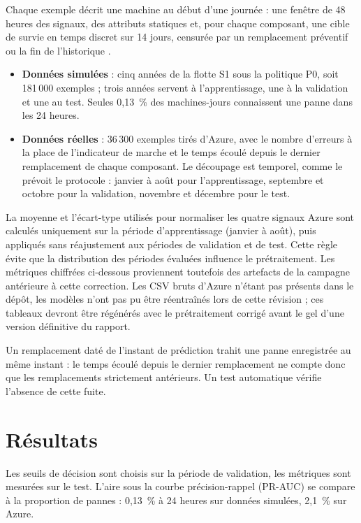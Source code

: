 \documentclass[11pt,a4paper,oneside]{report}
\begin{document}
Chaque exemple décrit une machine au début d'une journée : une fenêtre de 48 heures des signaux, des attributs statiques et, pour chaque composant, une cible de survie en temps discret sur 14 jours, censurée par un remplacement préventif ou la fin de l'historique \cite{gensheimer}.

\begin{itemize}
\item \textbf{Données simulées} : cinq années de la flotte S1 sous la politique P0, soit 181\,000 exemples ; trois années servent à l'apprentissage, une à la validation et une au test. Seules 0,13~\% des machines-jours connaissent une panne dans les 24 heures.
\item \textbf{Données réelles} : 36\,300 exemples tirés d'Azure, avec le nombre d'erreurs à la place de l'indicateur de marche et le temps écoulé depuis le dernier remplacement de chaque composant. Le découpage est temporel, comme le prévoit le protocole : janvier à août pour l'apprentissage, septembre et octobre pour la validation, novembre et décembre pour le test.
\end{itemize}

La moyenne et l'écart-type utilisés pour normaliser les quatre signaux Azure sont calculés
uniquement sur la période d'apprentissage (janvier à août), puis appliqués sans réajustement aux
périodes de validation et de test. Cette règle évite que la distribution des périodes évaluées
influence le prétraitement. Les métriques chiffrées ci-dessous proviennent toutefois des artefacts
de la campagne antérieure à cette correction. Les CSV bruts d'Azure n'étant pas présents dans le
dépôt, les modèles n'ont pas pu être réentraînés lors de cette révision ; ces tableaux devront être
régénérés avec le prétraitement corrigé avant le gel d'une version définitive du rapport.

Un remplacement daté de l'instant de prédiction trahit une panne enregistrée au même instant : le temps écoulé depuis le dernier remplacement ne compte donc que les remplacements strictement antérieurs. Un test automatique vérifie l'absence de cette fuite.

\section{Résultats}

Les seuils de décision sont choisis sur la période de validation, les métriques sont mesurées sur le test. L'aire sous la courbe précision-rappel (PR-AUC) se compare à la proportion de pannes : 0,13~\% à 24 heures sur données simulées, 2,1~\% sur Azure.
\end{document}
